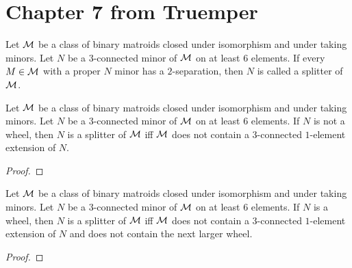 \section{Chapter 7 from Truemper}

\begin{definition}[splitter]
  \label{def:splitter}
  Let $\mathcal{M}$ be a class of binary matroids closed under isomorphism and under taking minors. Let $N$ be a $3$-connected minor of $\mathcal{M}$ on at least $6$ elements.
  If every $M \in \mathcal{M}$ with a proper $N$ minor has a $2$-separation, then $N$ is called a splitter of $\mathcal{M}$.
\end{definition}

\begin{theorem}
  \label{thm:7.2.1.a.splitter_nonwheel}
  Let $\mathcal{M}$ be a class of binary matroids closed under isomorphism and under taking minors. Let $N$ be a $3$-connected minor of $\mathcal{M}$ on at least $6$ elements.
  If $N$ is not a wheel, then $N$ is a splitter of $\mathcal{M}$ iff $\mathcal{M}$ does not contain a $3$-connected $1$-element extension of $N$.
\end{theorem}

\begin{proof}
\end{proof}

\begin{theorem}
  \label{thm:7.2.1.b.splitter_wheel}
  Let $\mathcal{M}$ be a class of binary matroids closed under isomorphism and under taking minors. Let $N$ be a $3$-connected minor of $\mathcal{M}$ on at least $6$ elements.
  If $N$ is a wheel, then $N$ is a splitter of $\mathcal{M}$ iff $\mathcal{M}$ does not contain a $3$-connected $1$-element extension of $N$ and does not contain the next larger wheel.
\end{theorem}

\begin{proof}
\end{proof}
